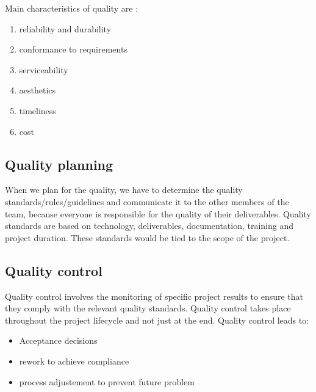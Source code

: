 \documentclass{article}
\begin{document}
Main characteristics of quality are :
\begin{enumerate}
    \item reliability and durability
    \item conformance to requirements
    \item serviceability
    \item aesthetics
    \item timeliness
    \item cost
\end{enumerate}

\subsection{Quality planning}
When we plan for the quality, we have to determine the quality standards/rules/guidelines and communicate it to the other members of the team, because everyone is responsible for the quality of their deliverables.\newline
Quality standards are based on technology, deliverables, documentation, training and project duration. These standards would be tied to the scope of the project.

\subsection{Quality control}
Quality control involves the monitoring of specific project results to ensure that they comply with the relevant quality standards.\newline
Quality control takes place throughout the project lifecycle and not just at the end. \newline
Quality control leads to:
\begin{itemize}
    \item Acceptance decisions
    \item rework to achieve compliance
    \item process adjustement to prevent future problem
\end{itemize}
\end{document}
